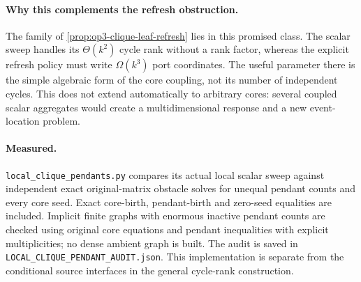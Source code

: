 \paragraph{Why this complements the refresh obstruction.}
The family of \cref{prop:op3-clique-leaf-refresh} lies in this promised
class. The scalar sweep handles its $\Theta(k^2)$ cycle rank without a
rank factor, whereas the explicit refresh policy must write $\Omega(k^3)$
port coordinates. The useful parameter there is the simple algebraic form
of the core coupling, not its number of independent cycles. This does not
extend automatically to arbitrary cores: several coupled scalar aggregates
would create a multidimensional response and a new event-location problem.

\paragraph{Measured.}
\texttt{local\_clique\_pendants.py} compares its actual local scalar sweep
against independent exact original-matrix obstacle solves for unequal
pendant counts and every core seed. Exact core-birth, pendant-birth and
zero-seed equalities are included. Implicit finite graphs with enormous
inactive pendant counts are checked using original core equations and
pendant inequalities with explicit multiplicities; no dense ambient graph
is built. The audit is saved in \texttt{LOCAL\_CLIQUE\_PENDANT\_AUDIT.json}.
This implementation is separate from the conditional source interfaces
in the general cycle-rank construction.
